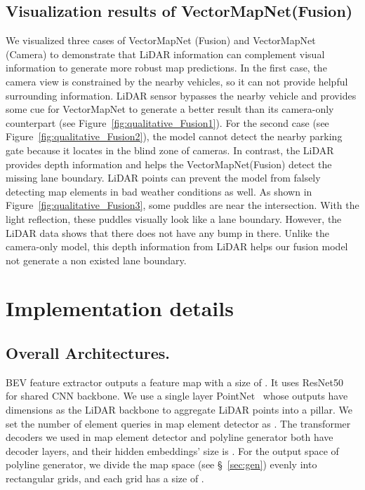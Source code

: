\documentclass{article}
\theoremstyle{plain}
\theoremstyle{definition}
\theoremstyle{remark}
\begin{document}
\subsection{Visualization results of VectorMapNet(Fusion)}
We visualized three cases of VectorMapNet (Fusion) and VectorMapNet (Camera) to demonstrate that LiDAR information can complement visual information to generate more robust map predictions.
In the first case, the camera view is constrained by the nearby vehicles, so it can not provide helpful surrounding information. LiDAR sensor bypasses the nearby vehicle and provides some cue for VectorMapNet to generate a better result than its camera-only counterpart (see Figure~\ref{fig:qualitative_Fusion1}). 
For the second case (see Figure~\ref{fig:qualitative_Fusion2}), the model cannot detect the nearby parking gate because it locates in the blind zone of cameras. In contrast, the LiDAR provides depth information and helps the VectorMapNet(Fusion) detect the missing lane boundary. 
LiDAR points can prevent the model from falsely detecting map elements in bad weather conditions as well. As shown in Figure~\ref{fig:qualitative_Fusion3}, some puddles are near the intersection. With the light reflection, these puddles visually look like a lane boundary. However, the LiDAR data shows that there does not have any bump in there. Unlike the camera-only model, this depth information from LiDAR helps our fusion model not generate a non existed lane boundary. 

\section{Implementation details}
\label{sec:implementation}
\subsection{Overall Architectures.} BEV feature extractor outputs a feature map with a size of . It uses ResNet50~\citep{he2016deep} for shared CNN backbone. We use a single layer PointNet~\citep{qi2017pointnet} whose outputs have  dimensions as the LiDAR backbone to aggregate LiDAR points into a pillar. 
We set the number of element queries  in map element detector as . 
The transformer decoders we used in map element detector and polyline generator both have  decoder layers, and their hidden embeddings' size is . 
For the output space of polyline generator, we divide the map space (see \S~\ref{sec:gen}) evenly into  rectangular grids, and each grid has a size of .
\end{document}
